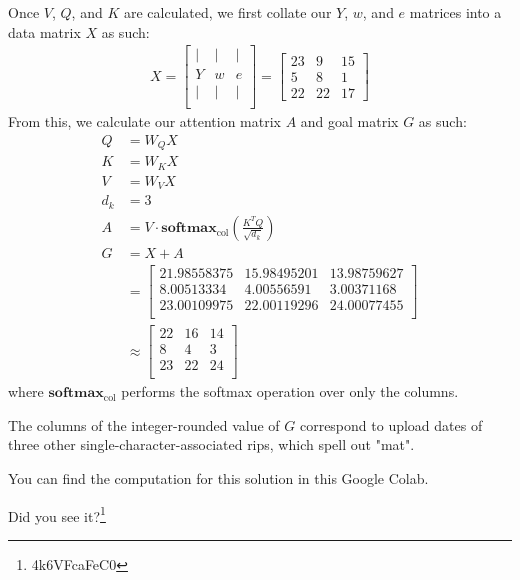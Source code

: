 \documentclass{article}
\begin{document}
Once $V$, $Q$, and $K$ are calculated, we first collate our $Y$, $w$, and $e$ matrices into a data matrix $X$ as such:
\begin{align*}
    X = \begin{bmatrix} | & | & |\\Y & w & e\\| & | & |\\\end{bmatrix}
    = \begin{bmatrix}23 & 9 & 15\\5 & 8 & 1\\22 & 22 & 17\end{bmatrix}
\end{align*}
From this, we calculate our attention matrix $A$ and goal matrix $G$ as such:
\begin{align*}
    Q &= W_QX\\
    K &= W_KX\\
    V &= W_VX\\
    d_k &= 3\\
    A &= V \cdot \mathbf{softmax}_\text{col}\left(\frac{K^TQ}{\sqrt{d_k}}\right)\\
    G &= X + A\\
    &= \begin{bmatrix}
    21.98558375 & 15.98495201 & 13.98759627 \\ 
     8.00513334 &  4.00556591 &  3.00371168 \\ 
    23.00109975 & 22.00119296 & 24.00077455 \\ 
    \end{bmatrix}\\
    &\approx \begin{bmatrix}
    22 & 16 & 14 \\
     8 &  4 &  3 \\
    23 & 22 & 24 \\
    \end{bmatrix}
 \end{align*}
where $\mathbf{softmax}_\text{col}$ performs the softmax operation over only the columns.

The columns of the integer-rounded value of $G$ correspond to upload dates of three other single-character-associated rips, which spell out "mat".

You can find the computation for this solution in this Google Colab.

\vspace{1cm}
Did you see it?\footnote{4k6VFcaFeC0}
\vspace{1cm}
\end{document}
